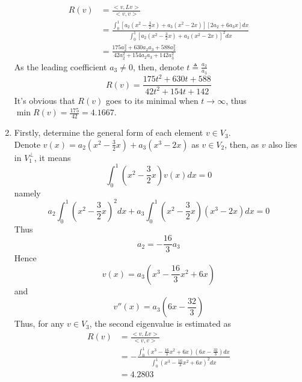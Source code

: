 \documentclass[paper=a4, fontsize=11pt]{scrartcl} %
\numberwithin{equation}{section} %
\numberwithin{figure}{section} %
\numberwithin{table}{section} %
\begin{document}
\begin{enumerate}
\begin{equation}
\begin{aligned}
					R(v) & = \frac{<v, Lv>}{<v, v>}\\
						& = \frac{\int_{0}^{1} [a_2 (x^2 - \frac{3}{2}x) + a_3(x^2 - 2 x)][2a_2 + 6a_3 x] dx }{\int_{0}^{1} [a_2 (x^2 - \frac{3}{2}x) + a_3(x^2 - 2 x)]^2 dx}\\
						& = \frac{175a_2^2 + 630a_2a_3 + 588a_3^2}{42a_2^2 + 154a_2a_3 + 142a_3^2}
				\end{aligned}
			\end{equation}
			As the leading coefficient $a_3\neq 0$, then, denote $t \triangleq \frac{a_2}{a_3}$
			\begin{equation}
				R(v) = \frac{175t^2 + 630 t + 588}{42t^2 + 154t + 142}
			\end{equation}
			It's obvious that $R(v)$ goes to its minimal when $t \rightarrow \infty$, thus $\min R(v) = \frac{175}{42}=4.1667$.
		\item 
			Firstly, determine the general form of each element $v \in V_3$.\\
			Denote $v(x) = a_2 (x^2 - \frac{3}{2}x) + a_3 (x^3 - 2x)$ as $v \in V_2$, then, as $v$ also lies in $V_1^\perp$, it means
			\begin{equation}
				\int_{0}^{1} (x^2 - \frac{3}{2}x) v(x) dx = 0
			\end{equation}
			namely
			\begin{equation}
				a_2 \int_{0}^{1} (x^2 - \frac{3}{2}x)^2 dx + a_3 \int_{0}^{1} (x^2 - \frac{3}{2}x)(x^3 - 2x) dx = 0
			\end{equation}
			Thus
			\begin{equation}
				a_2 = - \frac{16}{3} a_3
			\end{equation}
			Hence
			\begin{equation}
				v(x) = a_3(x^3 - \frac{16}{3}x^2 + 6x)
			\end{equation}
			and
			\begin{equation}
				v''(x) = a_3(6x - \frac{32}{3})
			\end{equation}
			Thus, for any $v \in V_3$, the second eigenvalue is estimated as
			\begin{equation}
				\begin{aligned}
					R(v) & = \frac{<v, Lv>}{<v, v>}\\
						& = -\frac{\int_{0}^{1} (x^3 - \frac{16}{3}x^2 + 6x)(6x - \frac{32}{3}) dx }{\int_{0}^{1} (x^3 - \frac{16}{3}x^2 + 6x)^2 dx}\\
						& = 4.2803
				\end{aligned}
			\end{equation}
	\end{enumerate}
\end{document}

